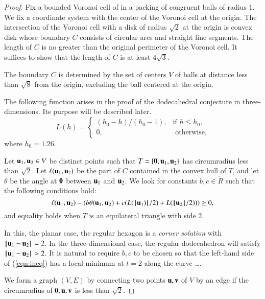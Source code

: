 \documentclass{llncs}
\begin{document}
\begin{proof} Fix a bounded Voronoi cell of in a packing of congruent
  balls of radius $1$.  We fix a coordinate system with the center of
  the Voronoi cell at the origin.  The intersection of the Voronoi
  cell with a disk of radius $\sqrt2$ at the origin is convex disk
  whose boundary $C$ consists of circular arcs and straight line
  segments.  The length of $C$ is no greater than the original
  perimeter of the Voronoi cell.  It suffices to show that the length
  of $C$ is at least $4\sqrt{3}$.



The boundary $C$ is determined by the set of centers $V$ of balls at
distance less than $\sqrt8$ from the origin, excluding the ball
centered at the origin.

The following function arises in the proof of the dodecahedral
conjecture in three-dimensions.  Its purpose will be described later.
\begin{equation}
L(h) = \begin{cases} 
   (h_0-h)/(h_0-1),& \text{if } h \le h_0,\\
  0,&\text{ otherwise},
 \end{cases}
\end{equation}
where $h_0 = 1.26$.  

Let ${\mathbf u}_1,{\mathbf u}_2\in V$ be distinct points such that
$T=\{{\mathbf 0},{\mathbf u}_1,{\mathbf u}_2\}$ has circumradius less than $\sqrt2$.  Let
$\ell({\mathbf u}_1,{\mathbf u}_2)$ be the part of $C$ contained in the convex hull of
$T$, and let $\theta$ be the angle at ${\mathbf 0}$ between ${\mathbf u}_1$ and
${\mathbf u}_2$.  We look for constants $b,c\in\ring{R}$ such that the
following conditions hold:
\begin{equation}\label{eqn:ineq}
\ell({\mathbf u}_1,{\mathbf u}_2) - (b \theta({\mathbf u}_1,{\mathbf u}_2) + c (L({{\hskip0.1em|\hskip-0.15em|\hskip0.1em}{\mathbf u}_1){\hskip0.1em|\hskip-0.15em|\hskip0.1em}}/2) + L({{\hskip0.1em|\hskip-0.15em|\hskip0.1em}{\mathbf u}_2{\hskip0.1em|\hskip-0.15em|\hskip0.1em}}/2))) \ge 0,
\end{equation}
and equality holds when $T$ is an equilateral triangle with side $2$.

In this, the planar case, the regular hexagon is a {\it corner
  solution} with $\norm{\u_1}{\u_2}=2$.  In the three-dimensional
case, the regular dodecahedron will satisfy $\norm{\u_1}{\u_2}>2$.  It
is natural to require $b,c$ to be chosen so that the left-hand side of
(\ref{eqn:ineq}) has a local minimum at $t=2$ along the curve \dots.


We form a graph $(V,E)$ by connecting two points ${\mathbf u},{\mathbf v}$
 of $V$
by an edge if the circumradius of ${\mathbf 0},{\mathbf u},{\mathbf v}$ is less than $\sqrt2$.  
\end{proof}
\end{document}
